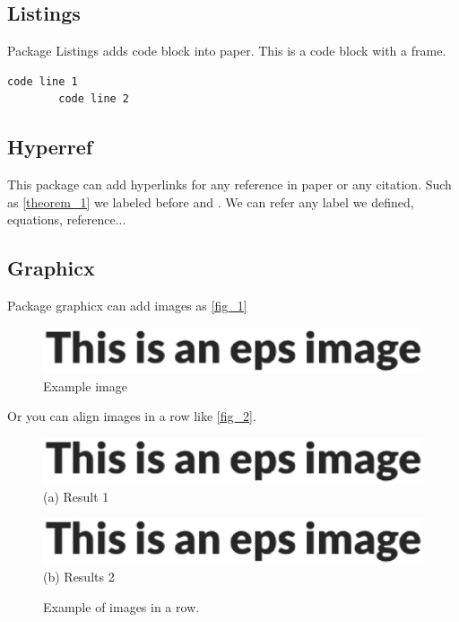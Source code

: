 \documentclass{article}
\begin{document}
    \subsection{Listings}
    Package Listings adds code block into paper.
    This is a code block with a frame.
    \begin{lstlisting}[frame = single]
        code line 1
        code line 2
    \end{lstlisting}

    \subsection{Hyperref}
    This package can add hyperlinks for any reference in paper or any citation.
    Such as \autoref{theorem_1} we labeled before and \cite{Example}. We can refer any label we defined, equations, reference...

    \subsection{Graphicx}
    Package graphicx can add images as \autoref{fig_1}

    \begin{figure}[ht]
        \centering %
        \includegraphics[width=\linewidth]{example}
        \caption{Example image} %
        \label{fig_1}
    \end{figure}
    
    Or you can align images in a row like \autoref{fig_2}.

    \begin{figure}[htb]
        \centering
        \begin{minipage}[t]{0.48\linewidth}
            \centering
            \includegraphics[width=\linewidth]{example}
            (a) Result 1
        \end{minipage}
        \begin{minipage}[t]{0.48\linewidth}
            \centering
            \includegraphics[width=\linewidth]{example}
            (b) Results 2
        \end{minipage}
   
        \caption{Example of images in a row.}
        \label{fig_2}
    \end{figure}
\end{document}
